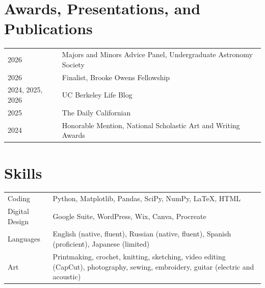 \documentclass[a4paper,12pt]{article}
\begin{document}
\section{Awards, Presentations, and Publications}
\begin{tabularx}{\linewidth}{@{}l X@{}}
2026 & \normalsize{Majors and Minors Advice Panel, Undergraduate Astronomy Society}\\
2026 &  \normalsize{Finalist, Brooke Owens Fellowship}\\
2024, 2025, 2026 &  \normalsize{UC Berkeley Life Blog}\\
2025  &  \normalsize{The Daily Californian}\\
2024 & \normalsize{Honorable Mention, National Scholastic Art and Writing Awards}\\  
\end{tabularx}

\section{Skills}
\begin{tabularx}{\linewidth}{@{}l X@{}}
Coding & \normalsize{Python, Matplotlib, Pandas, SciPy, NumPy, LaTeX, HTML }\\
Digital Design  &  \normalsize{Google Suite, WordPress, Wix, Canva, Procreate}\\
Languages &  \normalsize{English (native, fluent), Russian (native, fluent), Spanish (proficient), Japanese (limited)}\\  
Art & \normalsize{Printmaking, crochet, knitting, sketching, video editing (CapCut), photography, sewing, embroidery, guitar (electric and acoustic)}
\end{tabularx}

\vfill
{}
\end{document}
